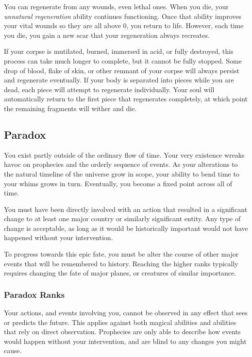              You can regenerate from any wounds, even lethal ones.
            When you die, your \textit{unnatural regeneration} ability continues functioning.
            Once that ability improves your vital wounds so they are all above 0, you return to life.
            However, each time you die, you gain a new scar that your regeneration always recreates.

            If your corpse is mutilated, burned, immersed in acid, or fully destroyed, this process can take much longer to complete, but it cannot be fully stopped.
            Some drop of blood, flake of skin, or other remnant of your corpse will always persist and regenerate eventually.
            If your body is separated into pieces while you are dead, each piece will attempt to regenerate individually.
            Your soul will automatically return to the first piece that regenerates completely, at which point the remaining fragments will wither and die.

    \subsection{Paradox}
        You exist partly outside of the ordinary flow of time.
        Your very existence wreaks havoc on prophecies and the orderly sequence of events.
        As your alterations to the natural timeline of the universe grow in scope, your ability to bend time to your whims grows in turn.
        Eventually, you become a fixed point across all of time.

         You must have been directly involved with an action that resulted in a significant change to at least one major country or similarly significant entity.
        Any type of change is acceptable, as long as it would be historically important would not have happened without your intervention.

         To progress towards this epic fate, you must be alter the course of other major events that will be remembered to history.
        Reaching the higher ranks typically requires changing the fate of major planes, or creatures of similar importance.

        \subsubsection{Paradox Ranks}
             Your actions, and events involving you, cannot be observed in any effect that sees or predicts the future.
            This applies against both magical abilities and abilities that rely on direct observation.
            Prophecies are only able to describe how events would happen without your intervention, and are blind to any changes you might cause.

